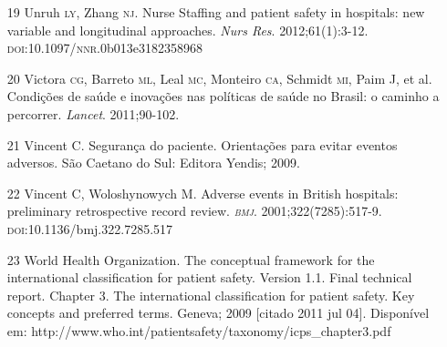 \documentclass{article}
\begin{document}
\begin{itemize}
\item[19] Unruh \textsc{ly}, Zhang \textsc{nj}. Nurse Staffing and patient safety in hospitals:
new
variable and longitudinal approaches. \textit{Nurs Res}. 2012;61(1):3-12.
\textsc{doi}:10.1097/\textsc{nnr}.0b013e3182358968

\item[20] Victora \textsc{cg}, Barreto \textsc{ml}, Leal \textsc{mc}, Monteiro \textsc{ca}, Schmidt \textsc{mi}, Paim J, et
al.
Condições de saúde e inovações nas políticas de saúde no Brasil: o caminho a
percorrer.
\textit{Lancet}. 2011;90-102.

\item[21] Vincent C. Segurança do paciente. Orientações para evitar eventos
adversos. São Caetano do Sul: Editora Yendis; 2009.

\item[22] Vincent C, Woloshynowych M. Adverse events in British hospitals:
preliminary retrospective record review. \textit{\textsc{bmj}}. 2001;322(7285):517-9.
\textsc{doi}:10.1136/bmj.322.7285.517

\item[23] World Health Organization. The conceptual framework for the
international
classification for patient safety. Version 1.1. Final technical report. Chapter
3. The
international classification for patient safety. Key concepts and preferred
terms. Geneva;
2009 [citado 2011 jul 04]. Disponível em:
http://www.who.int/patientsafety/taxonomy/icps\_{}chapter3.pdf

\end{itemize}
\end{document}
